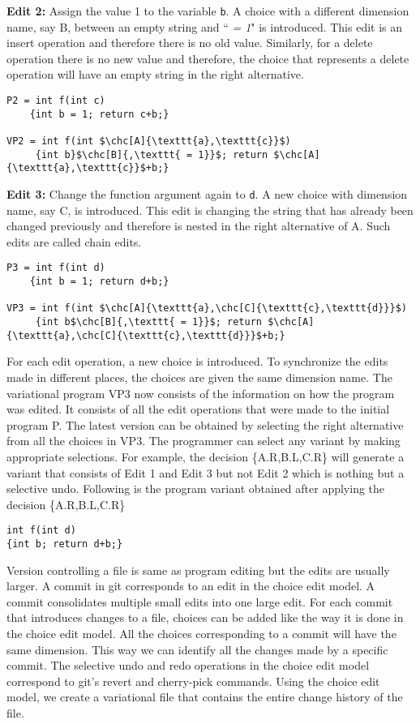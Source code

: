 \textbf{Edit 2:} Assign the value 1 to the variable \texttt{b}. A choice with a different dimension name, say B, between an empty string and ``\textit{ = 1}" is introduced. This edit is an insert operation and therefore there is no old value. Similarly, for a delete operation there is no new value and therefore, the choice that represents a delete operation will have an empty string in the right alternative.

\begin{lstlisting}
P2 = int f(int c)
    {int b = 1; return c+b;}
    
VP2 = int f(int $\chc[A]{\texttt{a},\texttt{c}}$)
     {int b}$\chc[B]{,\texttt{ = 1}}$; return $\chc[A]{\texttt{a},\texttt{c}}$+b;}
\end{lstlisting}

\textbf{Edit 3:} Change the function argument again to \texttt{d}. A new choice with dimension name, say C, is introduced. This edit is changing the string that has already been changed previously and therefore is nested in the right alternative of A. Such edits are called chain edits.

\begin{lstlisting}
P3 = int f(int d)
    {int b = 1; return d+b;}
    
VP3 = int f(int $\chc[A]{\texttt{a},\chc[C]{\texttt{c},\texttt{d}}}$)
     {int b$\chc[B]{,\texttt{ = 1}}$; return $\chc[A]{\texttt{a},\chc[C]{\texttt{c},\texttt{d}}}$+b;}
\end{lstlisting}

For each edit operation, a new choice is introduced. To synchronize the edits made in different places, the choices are given the same dimension name. The variational program VP3 now consists of the information on how the program was edited. It consists of all the edit operations that were made to the initial program P. The latest version can be obtained by selecting the right alternative from all the choices in VP3. The programmer can select any variant by making appropriate selections. For example, the decision \{A.R,B.L,C.R\} will generate a variant that consists of Edit 1 and Edit 3 but not Edit 2 which is nothing but a selective undo. Following is the program variant obtained after applying the decision  \{A.R,B.L,C.R\}

\begin{lstlisting}
int f(int d)
{int b; return d+b;}
\end{lstlisting}

Version controlling a file is same as program editing but the edits are usually larger. A commit in git corresponds to an edit in the choice edit model. A commit consolidates multiple small edits into one large edit. For each commit that introduces changes to a file, choices can be added like the way it is done in the choice edit model. All the choices corresponding to a commit will have the same dimension. This way we can identify all the changes made by a specific commit. The selective undo and redo operations in the choice edit model correspond to git's revert and cherry-pick commands. Using the choice edit model, we create a variational file that contains the entire change history of the file.

